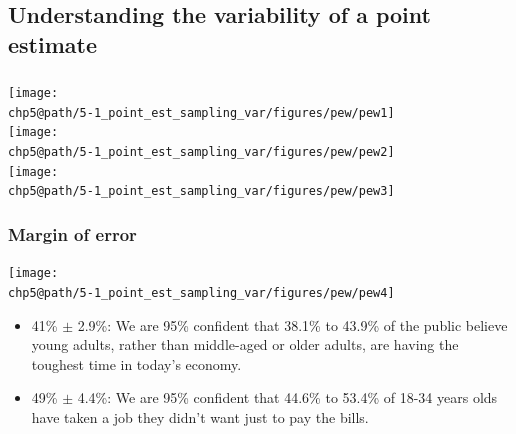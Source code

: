 \documentclass[t,compress,mathserif]{beamer}
\makeatletter
\def\chp5@path{../../Chp 5}
\makeatother
\begin{document}
\subsection{Understanding the variability of a point estimate}


\begin{frame}
    \frametitle{}
    
    \begin{center}
    \texttt{[image: \\chp5@path/5-1\_point\_est\_sampling\_var/figures/pew/pew1]} \\
    \texttt{[image: \\chp5@path/5-1\_point\_est\_sampling\_var/figures/pew/pew2]} \\
    \texttt{[image: \\chp5@path/5-1\_point\_est\_sampling\_var/figures/pew/pew3]}
    \end{center}
    
    
\end{frame}


\begin{frame}
    \frametitle{Margin of error}
    
    \begin{center}
    \texttt{[image: \\chp5@path/5-1\_point\_est\_sampling\_var/figures/pew/pew4]}
    \end{center}
    
    \begin{itemize}
    
    \item 41\% $\pm$ 2.9\%: We are 95\% confident that 38.1\% to 43.9\% of the public believe young adults, rather than middle-aged or older adults, are having the toughest time in today's economy.
    
    \item 49\% $\pm$ 4.4\%: We are 95\% confident that 44.6\% to 53.4\% of 18-34 years olds have taken a job they didn't want just to pay the bills.
    
    \end{itemize}
    
\end{frame}
\end{document}
